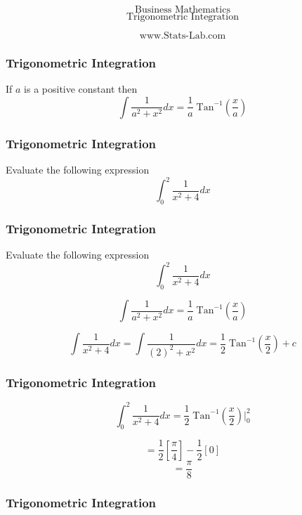 \documentclass{beamer}
\begin{document}
\begin{frame}
\Huge
\[\mbox{Business Mathematics} \]
\huge
\[\mbox{Trigonometric Integration} \]

\LARGE
\[ \mbox{www.Stats-Lab.com} \]
\end{frame}
\begin{frame}
\frametitle{Trigonometric Integration}
\LARGE
\vspace{-2cm}
If $a$ is a positive constant then
\[ \int \frac{1}{a^2 +x^2} dx  = \frac{1}{a}\;\mbox{Tan}^{-1}\left(\frac{x}{a}\right)\]

\end{frame}

\begin{frame}
\frametitle{Trigonometric Integration}
\LARGE
\vspace{-2cm}
Evaluate the following expression
\[ \int^{2}_{0} \frac{1}{x^2+4} dx \]

\end{frame}

\begin{frame}
\frametitle{Trigonometric Integration}
\Large
\vspace{-0.5cm}
Evaluate the following expression
\[ \int^{2}_{0} \frac{1}{x^2+4} dx \]

\Large
\[ \int \frac{1}{a^2 +x^2} dx  = \frac{1}{a}\;\mbox{Tan}^{-1}\left(\frac{x}{a}\right)\]

\Large
\[ \int\frac{1}{x^2+4}dx  = \int \frac{1}{(2)^2 +x^2} dx  = \frac{1}{2}\;\mbox{Tan}^{-1}\left(\frac{x}{2}\right)+c\]

\end{frame}

\begin{frame}
\frametitle{Trigonometric Integration}
\Large
\vspace{-0.5cm}
\[ \int^{2}_{0} \frac{1}{x^2+4}dx  = \frac{1}{2}\;\mbox{Tan}^{-1}\left(\frac{x}{2}\right)\bigg|^{2}_{0} \]

\[ = \frac{1}{2} \left[\frac{\pi}{4}\right] -  \frac{1}{2}   \left[0\right]       \]
\LARGE
\[=\frac{\pi}{8}\]
\end{frame}
\begin{frame}
\frametitle{Trigonometric Integration}
\end{frame}
\end{document}
